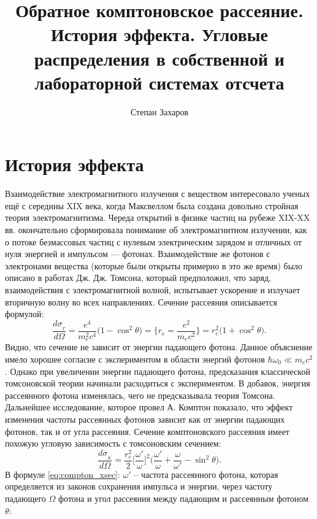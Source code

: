 \documentclass[12pt]{article}
\title{Обратное комптоновское рассеяние. История эффекта. Угловые распределения в собственной и лабораторной системах отсчета}
\author{Степан Захаров}
\begin{document}
\maketitle

\vspace{-3em} 

\section{История эффекта}
Взаимодействие электромагнитного излучения с веществом интересовало ученых ещё с середины  XIX века, когда Максвеллом была создана довольно стройная теория электромагнитизма. Череда открытий в физике частиц на рубеже XIX-XX  вв. окончательно сформировала понимание об электромагнитном излучении, как о потоке безмассовых частиц с нулевым электрическим зарядом и отличных от нуля энергией и импульсом --- фотонах. Взаимодействие же фотонов с электронами вещества (которые были открыты примерно в это же время) было описано в работах Дж. Дж. Томсона, который предположил, что заряд, взаимодействия с электромагнитной волной, испытывает ускорение и излучает вторичную волну во всех направлениях. Сечение рассеяния описывается формулой:
\begin{equation}
	\frac{d \sigma_{_T}}{d\Omega} = \frac{e^4}{m_e^2 c^4} \big(1-\cos^2\theta\big) = \bigg\{r_e = \frac{e^2}{m_e c^2} \bigg\} = r_e^2\big(1+\cos^2\theta\big).
	\label{eq:tomson_xsec}
\end{equation}
Видно, что сечение не зависит от энергии падающего фотона. Данное объяснение имело хорошее согласие с экспериментом в области энергий фотонов $\hbar \omega_0 \ll m_e c^2$. Однако при увеличении энергии падающего фотона, предсказания классической томсоновской теории начинали расходиться с экспериментом. В добавок, энергия рассеянного фотона изменялась, чего не предсказывала теория Томсона. Дальнейшее исследование, которое провел А. Комптон показало, что эффект изменения частоты рассеянных фотонов зависит как от энергии падающих фотонов, так и от угла рассеяния. 
Сечение комптоновского рассеяния имеет похожую угловую зависимость с томсоновским сечением:
\begin{equation}
\frac{d \sigma_{_K}}{d\Omega} = \frac{r_e^2}{2} \bigg[\frac{\omega'}{\omega}\bigg]^2 \bigg(\frac{\omega'}{\omega}+\frac{\omega}{\omega'} - \sin^2\theta\bigg). 
\label{eq:compton_xsec}
\end{equation}
В формуле \ref{eq:compton_xsec}: $\omega'$ -- частота рассеянного фотона, которая определяется из законов сохранения импульса и энергии, через частоту падающего $\Omega$ фотона и угол рассеяния между падающим и рассеянным фотоном $\theta$:
\end{document}
